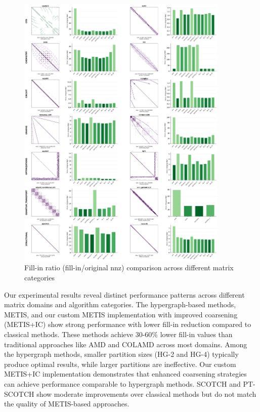 \begin{figure}[H]
\centering
\includegraphics[width=0.9\textwidth]{fig/res/fillin_all_categories.png}
\caption{Fill-in ratio (fill-in/original nnz) comparison across different matrix categories}
\label{fig:fillin-categories}
\end{figure}

Our experimental results reveal distinct performance patterns across different matrix domains and algorithm categories. The hypergraph-based methods, METIS, and our custom METIS implementation with improved coarsening (METIS+IC) show strong performance with lower fill-in reduction compared to classical methods. These methods achieve 30-60\% lower fill-in values than traditional approaches like AMD and COLAMD across most domains. Among the hypergraph methods, smaller partition sizes (HG-2 and HG-4) typically produce optimal results, while larger partitions are ineffective. Our custom METIS+IC implementation demonstrates that enhanced coarsening strategies can achieve performance comparable to hypergraph methods. SCOTCH and PT-SCOTCH show moderate improvements over classical methods but do not match the quality of METIS-based approaches.


